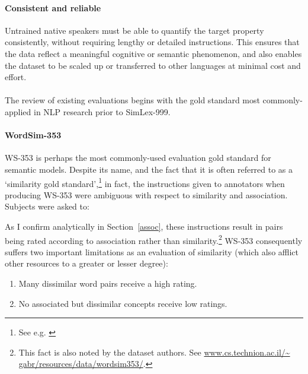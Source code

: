 \paragraph{Consistent and reliable} Untrained native speakers must be able to quantify the target property consistently, without requiring lengthy or detailed instructions. This ensures that the data reflect a meaningful cognitive or semantic phenomenon, and also enables the dataset to be scaled up or transferred to other languages at minimal cost and effort.

\paragraph{}The review of existing evaluations begins with the gold standard most commonly-applied in NLP research prior to SimLex-999. 

\noindent 

\paragraph{\bf WordSim-353}WS-353 \cite{finkelstein2001placing} is perhaps the most commonly-used evaluation gold standard for semantic models. Despite its name, and the fact that it is often referred to as a `similarity gold standard',\footnote{See e.g. \cite{huang2012improving,bansal2014tailoring}} in fact, the instructions given to annotators when producing WS-353 were ambiguous with respect to similarity and association. Subjects were asked to: 

\noindent 

As I confirm analytically in Section~\ref{assoc}, these instructions result in pairs being rated according to association rather than similarity.\footnote{This fact is also noted by the dataset authors. See \url{www.cs.technion.ac.il/~ gabr/resources/data/wordsim353/}.} WS-353 consequently suffers two important limitations as an evaluation of similarity (which also afflict other resources to a greater or lesser degree):  

\begin{enumerate}

\item Many dissimilar word pairs receive a high rating. 

\item No associated but dissimilar concepts receive low ratings. 

\end{enumerate}

